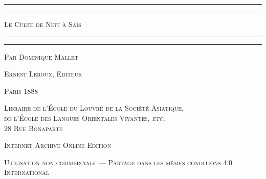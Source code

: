 \documentclass[a4paper, 11pt, oneside]{article}
\begin{document}
\renewcommand{\thefigure}{\bfseries{\arabic{figure}}}

\renewcommand\thefootnote{{\bfseries\color{myRed}\footnotesize{\arabic{footnote}}}}
\let\oldfootnote\footnote
    \renewcommand{\footnote}[1]{\oldfootnote{{\small\bfseries\color{myRed}#1}}}
\bfseries
\begin{titlepage} %
	\centering %

	
	\rule{\textwidth}{1.6pt}\vspace*{-\baselineskip}\vspace*{2pt} %
	\rule{\textwidth}{0.4pt} %
	
	\vspace{1\baselineskip} %
	
	{\scshape\Huge Le Culte de Neit à Saïs}
	
	\vspace{1\baselineskip} %

	\rule{\textwidth}{0.4pt}\vspace*{-\baselineskip}\vspace{3.2pt} %
	\rule{\textwidth}{1.6pt} %
	
	\vspace{1\baselineskip} %
	
	
	{\scshape \Large Par Dominique Mallet} %
	
	\vspace*{1\baselineskip} %
	
        {\scshape\scriptsize Ernest Leroux, Editeur} %
    
        \vspace*{\fill}

	\vspace{1\baselineskip}

	{\small\scshape Paris 1888}
	
	{\small\scshape{Libraire de l'École du Louvre de la Société Asiatique,\\ de l'École des Langues Orientales Vivantes, \emph{etc.} \\ 28 Rue Bonaparte}}
	
	\vspace{0.5\baselineskip} %

        \scshape Internet Archive Online Edition  %
	
	{\scshape\small Utilisation non commerciale --- Partage dans les mêmes conditions 4.0 International} %
\end{titlepage}
\end{document}

